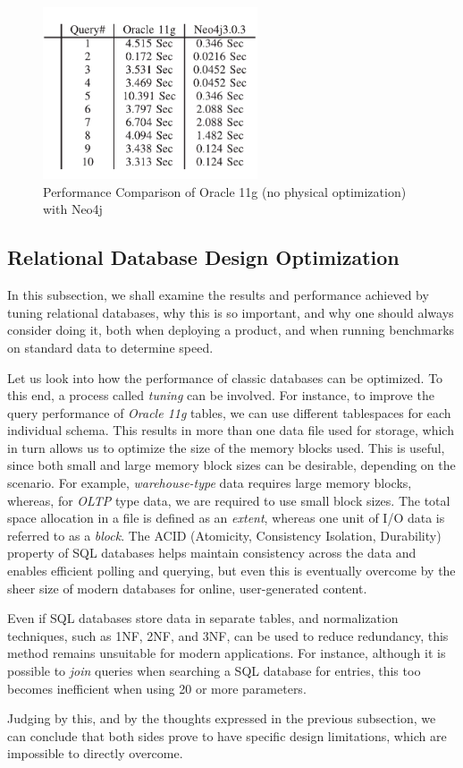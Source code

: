 \documentclass[10pt,        %
               a4paper,     %
               journal,     %
               ]{IEEEtran}
\begin{document}
\begin{figure}[!t]
	\centering
	\includegraphics[width=2.5in]{plots/no tuning table}
	\caption{Performance Comparison of Oracle 11g (no physical optimization) with Neo4j \cite{IEEEpaper1:comparison}}
	\label{table_no_phys_vs_neo4j}
\end{figure}

\subsection{Relational Database Design Optimization}
In this subsection, we shall examine the results and performance achieved by tuning relational databases, why this is so important, and why one should always consider doing it, both when deploying a product, and when running benchmarks on standard data to determine speed. \par
Let us look into how the performance of classic databases can be optimized. To this end, a process called \textit{tuning} can be involved. For instance, to improve the query performance of \textit{Oracle 11g} tables, we can use different tablespaces for each individual schema.  This results in more than one data file used for storage, which in turn allows us to optimize the size of the memory blocks used. This is useful, since both small and large memory block sizes can be desirable, depending on the scenario. For example, \textit{warehouse-type} data requires large memory blocks, whereas, for \textit{OLTP} type data, we are required to use small block sizes. The total space allocation in a file is defined as an \textit{extent}, whereas one unit of I/O data is referred to as a \textit{block}. 
The ACID (Atomicity, Consistency Isolation, Durability) property of SQL databases helps maintain consistency across the data and enables efficient polling and querying, but even this is eventually overcome by the sheer size of modern databases for online, user-generated content. \par
Even if SQL databases store data in separate tables, and normalization techniques, such as 1NF, 2NF, and 3NF, can be used to reduce redundancy, this method remains unsuitable for modern applications. For instance, although it is possible to \textit{join} queries when searching a SQL database for entries, this too becomes inefficient when using 20 or more parameters. \par
Judging by this, and by the thoughts expressed in the previous subsection, we can conclude that both sides prove to have specific design limitations, which are impossible to directly overcome. \par
\end{document}
